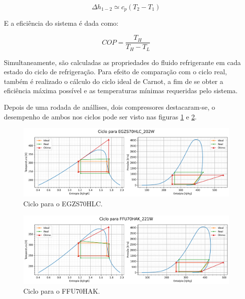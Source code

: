 \begin{equation}
    \Delta h_{1-2} \simeq  c_p (T_2-T_1)
    \label{simplificacao entalpia}
\end{equation}

    E a eficiência do sistema é dada como:

\begin{equation}
    COP = \frac{T_H}{T_H - T_L}
    \label{COP carnot}
\end{equation}

\newpage    

Simultaneamente, são calculadas as propriedades do fluido refrigerante em cada estado do ciclo de refrigeração. Para efeito de comparação com o ciclo real, também é realizado o cálculo do ciclo ideal de Carnot, a fim de se obter a eficiência máxima possível e as temperaturas mínimas requeridas pelo sistema.

Depois de uma rodada de anállises, dois compressores destacaram-se, o desempenho de ambos nos ciclos pode ser visto nas figuras \ref{fig:ciclo comp 1} e \ref{fig:ciclo comp 2}.

\begin{figure}[h]
    \centering
    \includegraphics[width=0.9\linewidth]{Imagens/Desenvolvimento/ciclo_EGZS70HLC_202W.png}
    \caption{Ciclo para o EGZS70HLC.}
    \label{fig:ciclo comp 1}
\end{figure}

\begin{figure}[h]
    \centering
    \includegraphics[width=0.9\linewidth]{Imagens/Desenvolvimento/ciclo_FFU70HAK_221W.png}
    \caption{Ciclo para o FFU70HAK.}
    \label{fig:ciclo comp 2}
\end{figure}

